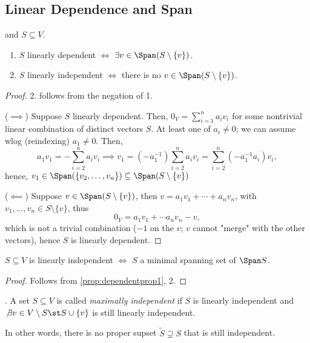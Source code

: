 \subsection{Linear Dependence and Span}

\begin{proposition}\label{prop:dependentprop1}
     and $S \subseteq V$.
    \begin{enumerate}
        \item $S$ linearly dependent $\iff$ $\exists v \in \Span (S \setminus \{v\})$.
        \item $S$ linearly independent $\iff$ there is no $v \in \Span (S \setminus \{v\})$.
    \end{enumerate} 
\end{proposition}

\begin{proof}
    2. follows from the negation of 1.

    \noindent($\implies$) Suppose $S$ linearly dependent. Then, $0_V = \sum_{i=1}^n a_i v_i$ for some nontrivial linear combination of distinct vectors $S$. At least one of $a_i \neq 0$; we can assume wlog (reindexing) $a_1 \neq 0$. Then, 
    \[
    a_1 v_1 = -\sum_{i=2}^n a_i v_i \implies v_1 = (-a_1^{-1}) \sum_{i=2}^n a_iv_i = \sum_{i=2}^{n} (-a_1^{-1}a_i)v_i,
    \]
    hence, $v_1 \in \Span (\{v_2, \dots, v_n\}) \subseteq \Span (S \setminus \{v \})$

    \noindent ($\impliedby$) Suppose $v \in \Span (S \setminus \{v\})$, then $v = a_1 v_1 + \cdots + a_n v_n$, with $v_1, \dots, v_n \in S \setminus \{v\}$, thus \[
    0_V = a_1 v_1 + \cdots a_n v_n - v,    
    \]
    which is not a trivial combination ($-1$ on the $v$; $v$ cannot "merge" with the other vectors), hence $S$ is linearly dependent.
\end{proof}

\begin{corollary}
    $S \subseteq V$ is linearly independent $\iff$ $S$ a minimal spanning set of $\Span S$.
\end{corollary}

\begin{proof}
    Follows from \cref{prop:dependentprop1}, 2.
\end{proof}

\begin{definition}
     . A set $S \subseteq V$ is called \emph{maximally independent} if $S$ is linearly independent and $\not \exists v \in V \setminus S \st S \cup \{v\}$ is still linearly independent.
    
    In other words, there is no proper supset $\tilde{S} \supsetneq S$ that is still independent.
\end{definition}

